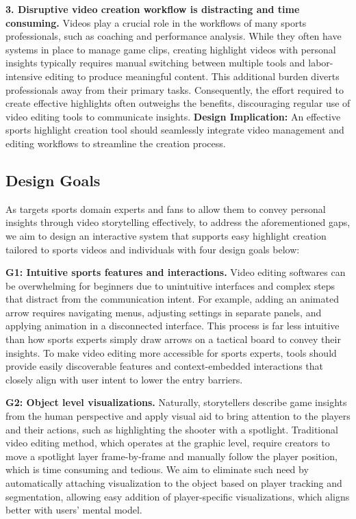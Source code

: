 \textbf{3. Disruptive video creation workflow is distracting and time consuming.} 
Videos play a crucial role in the workflows of many sports professionals, such as coaching and performance analysis. While they often have systems in place to manage game clips, creating highlight videos with personal insights typically requires manual switching between multiple tools and labor-intensive editing to produce meaningful content.
This additional burden diverts professionals away from their primary tasks. Consequently, the effort required to create effective highlights often outweighs the benefits, discouraging regular use of video editing tools to communicate insights.
\textbf{Design Implication:} An effective sports highlight creation tool should seamlessly integrate video management and editing workflows to streamline the creation process.



\subsection{Design Goals}
As \SB{} targets sports domain experts and fans to allow them to convey personal insights through video storytelling effectively, to address the aforementioned gaps,
we aim to design an interactive system that supports easy highlight creation tailored to sports videos and individuals with four design goals below:

\textbf{G1: Intuitive sports features and interactions.} Video editing softwares can be overwhelming for beginners due to unintuitive interfaces and complex steps that distract from the communication intent. For example, adding an animated arrow requires navigating menus, adjusting settings in separate panels, and applying animation in a disconnected interface. This process is far less intuitive than how sports experts simply draw arrows on a tactical board to convey their insights.
To make video editing more accessible for sports experts, tools should provide easily discoverable features and context-embedded interactions that closely align with user intent to lower the entry barriers.

\textbf{G2: Object level visualizations.} Naturally, storytellers describe game insights from the human perspective and apply visual aid to bring attention to the players and their actions, such as highlighting the shooter with a spotlight. Traditional video editing method, which operates at the graphic level, require creators to move a spotlight layer frame-by-frame and manually follow the player position, which is time consuming and tedious. We aim to eliminate such need by automatically attaching visualization to the object based on player tracking and segmentation, allowing easy addition of player-specific visualizations, which aligns better with users' mental model.


